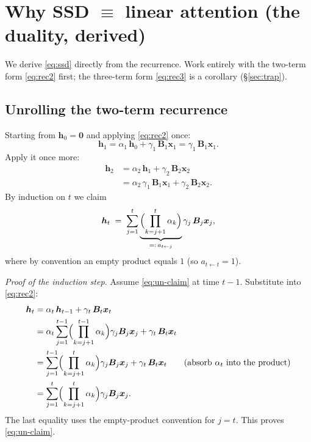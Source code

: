 \documentclass[11pt,a4paper]{article}
\begin{document}
\section{Why SSD $\equiv$ linear attention (the duality, derived)}
\label{sec:ssd}

We derive \eqref{eq:ssd} directly from the recurrence. Work entirely
with the two-term form \eqref{eq:rec2} first; the three-term form
\eqref{eq:rec3} is a corollary (\S\ref{sec:trap}).

\subsection{Unrolling the two-term recurrence}

Starting from $\bm{h}_0 = \bm{0}$ and applying \eqref{eq:rec2} once:
\begin{equation}\label{eq:un1}
  \bm{h}_1 = \alpha_1\,\bm{h}_0 + \gamma_1\,\bm{B}_1\bm{x}_1
           = \gamma_1\,\bm{B}_1\bm{x}_1.
\end{equation}
Apply it once more:
\begin{align}
  \bm{h}_2 &= \alpha_2\,\bm{h}_1 + \gamma_2\,\bm{B}_2\bm{x}_2 \nonumber \\
           &= \alpha_2\,\gamma_1\,\bm{B}_1\bm{x}_1
             + \gamma_2\,\bm{B}_2\bm{x}_2. \label{eq:un2}
\end{align}
By induction on $t$ we claim
\begin{equation}\label{eq:un-claim}
  \bm{h}_t \;=\; \sum_{j=1}^{t}
     \underbrace{\Bigl(\prod_{k=j+1}^{t}\alpha_k\Bigr)}_{=:\,a_{t\leftarrow j}}
     \gamma_j\,\bm{B}_j\bm{x}_j,
\end{equation}
where by convention an empty product equals $1$ (so
$a_{t\leftarrow t} = 1$).

\emph{Proof of the induction step.} Assume \eqref{eq:un-claim} at
time $t-1$. Substitute into \eqref{eq:rec2}:
\begin{align}
  \bm{h}_t
   &= \alpha_t\,\bm{h}_{t-1} + \gamma_t\,\bm{B}_t\bm{x}_t \\
   &= \alpha_t \sum_{j=1}^{t-1}
        \Bigl(\prod_{k=j+1}^{t-1}\alpha_k\Bigr)\gamma_j\bm{B}_j\bm{x}_j
        + \gamma_t\,\bm{B}_t\bm{x}_t \\
   &= \sum_{j=1}^{t-1}
        \Bigl(\prod_{k=j+1}^{t}\alpha_k\Bigr)\gamma_j\bm{B}_j\bm{x}_j
        + \gamma_t\,\bm{B}_t\bm{x}_t
        \qquad\text{(absorb $\alpha_t$ into the product)}\\
   &= \sum_{j=1}^{t}
        \Bigl(\prod_{k=j+1}^{t}\alpha_k\Bigr)\gamma_j\bm{B}_j\bm{x}_j.
\end{align}
The last equality uses the empty-product convention for $j=t$. This
proves \eqref{eq:un-claim}.
\end{document}
